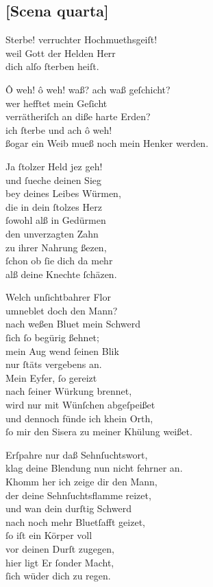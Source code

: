 \documentclass{ees}
\newenvironment{lyrics}[1]{%
  \subsection{#1}\nopagebreak%
  \begin{lyricslist}%
  \let\voice\item%
}{%
  \end{lyricslist}%
}
\begin{document}
\begin{lyrics}{[Scena quarta]}
  \voice[Jahel]
  Sterbe! verruchter Hochmuethsgeiſt!\\
  weil Gott der Helden Herr\\
  dich alſo ſterben heiſt.

  \voice[Sisera]
  Ô weh! ô weh! waß? ach waß geſchicht?\\
  wer hefftet mein Geſicht\\
  verrätheriſch an diße harte Erden?\\
  ich ſterbe und ach ô weh!\\
  ßogar ein Weib mueß noch mein Henker werden.

  \voice[Jahel]
  Ja ſtolzer Held jez geh!\\
  und ſueche deinen Sieg\\
  bey deines Leibes Würmen,\\
  die in dein ſtolzes Herz\\
  ſowohl alß in Gedürmen\\
  den unverzagten Zahn\\
  zu ihrer Nahrung ßezen,\\
  ſchon ob ſie dich da mehr\\
  alß deine Knechte ſchäzen.
  \enlargethispage\baselineskip
  \voice[Barak]
  Welch unſichtbahrer Flor\\
  umneblet doch den Mann?\\
  nach weßen Bluet mein Schwerd\\
  ſich ſo begürig ßehnet;\\
  mein Aug wend ſeinen Blik\\
  nur ſtäts vergebens an.\\
  Mein Eyfer, ſo gereizt\\
  nach ſeiner Würkung brennet,\\
  wird nur mit Wünſchen abgeſpeißet\\
  und dennoch fünde ich khein Orth,\\
  ſo mir den Sisera zu meiner Khülung weißet.

  \voice[Jahel]
  Erſpahre nur daß Sehnſuchtswort,\\
  klag deine Blendung nun nicht fehrner an.\\
  Khomm her ich zeige dir den Mann,\\
  der deine Sehnſuchtsflamme reizet,\\
  und wan dein durſtig Schwerd\\
  nach noch mehr Bluetſafft geizet,\\
  ſo iſt ein Körper voll\\
  vor deinen Durſt zugegen,\\
  hier ligt Er ſonder Macht,\\
  ſich wüder dich zu regen.


\end{lyrics}
\end{document}
